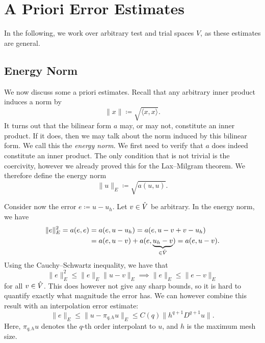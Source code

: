 \section{A Priori Error Estimates}
\label{sec:a_priori_estimates}

In the following, we work over arbitrary test and trial spaces \( V \), as
these estimates are general.

\subsection{Energy Norm}
We now discuss some a priori estimates. Recall that any arbitrary inner product
induces a norm by
\begin{equation}
    \| x \| \coloneqq \sqrt{ \langle x, x \rangle }.
\end{equation}
It turns out that the bilinear form \( a \) may, or may not, constitute an
inner product. If it does, then we may talk about the norm induced by this
bilinear form.  We call this the \emph{energy norm}. We first need to verify
that \( a \) does indeed constitute an inner product. The only condition that
is not trivial is the coercivity, however we already proved this for the
Lax--Milgram theorem. We therefore define the energy norm
\begin{equation}
    \|u\|_E \coloneqq \sqrt{a(u, u)}.
\end{equation}

Consider now the error \( e \coloneqq u - u_h \). Let \(v \in \hat{V}\) be
arbitrary. In the energy norm, we have
\begin{align}
    \| e \|_E^2 = a(e, e) &= a(e, u - u_h) = a(e, u - v + v - u_h) \\
                          &= a(e, u - v) + a(e, \underbrace{u_h - v}_{\in \hat{V}}) = a(e, u-v).
\end{align}
Using the Cauchy--Schwartz inequality, we have that
\begin{equation}
     \| e \|_E^2 \leq \|e\|_E \|u - v\|_E \implies \| e \|_E \leq \|e - v\|_E
\end{equation}
for all \( v \in \hat{V} \). This does however not give any sharp bounds, so it
is hard to quantify exactly what magnitude the error has. We can however
combine this result with an interpolation error estimate:
\begin{equation}
    \| e \|_E \leq \| u - \pi_{q, h} u\|_E \leq C(q) \| h^{q + 1}
    D^{q+1} u\|.
\end{equation}
Here, \( \pi_{q, h} u\) denotes the \( q \)-th order interpolant to \( u \),
and \( h \) is the maximum mesh size.


